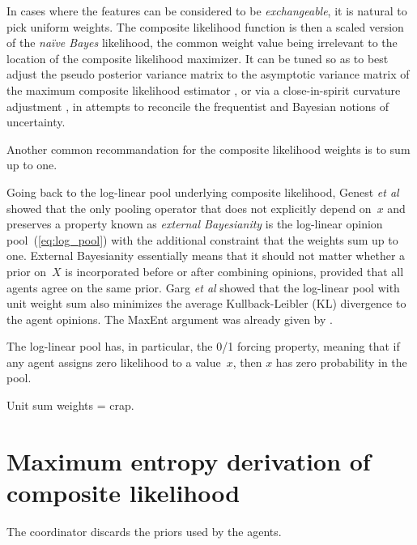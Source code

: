 \documentclass[english]{scrartcl}
\begin{document}
In cases where the features can be considered to be {\em exchangeable}, it is natural to pick uniform weights. The composite likelihood function is then a scaled version of the {\em na\"ive Bayes} likelihood, the common weight value being irrelevant to the location of the composite likelihood maximizer. It can be tuned so as to best adjust the pseudo posterior variance matrix to the asymptotic variance matrix of the maximum composite likelihood estimator \cite{Pauli-11}, or via a close-in-spirit curvature adjustment \cite{Ribatet-12}, in attempts to reconcile the frequentist and Bayesian notions of uncertainty.

Another common recommandation for the composite likelihood weights is to sum up to one. 

Going back to the log-linear pool underlying composite likelihood, Genest {\em et al} \cite{Genest-86b} showed that the only pooling operator that does not explicitly depend on~$x$ and preserves a property known as {\em external Bayesianity} is the log-linear opinion pool~(\ref{eq:log_pool}) with the additional constraint that the weights  sum up to one. External Bayesianity essentially means that it should not matter whether a prior on~$X$ is incorporated before or after combining opinions, provided that all agents agree on the same prior. Garg {\em et al} \cite{Garg-04} showed that the log-linear pool with unit weight sum also minimizes the average Kullback-Leibler (KL) divergence to the agent opinions.
The MaxEnt argument was already given by \cite{Wang-14}.



The log-linear pool has, in particular, the 0/1 forcing property, meaning that if any agent assigns zero likelihood to a value~$x$, then $x$ has zero probability in the pool. 

Unit sum weights = crap. 

\section{Maximum entropy derivation of composite likelihood}
\label{sec:maxent}

The coordinator discards the priors used by the agents. 
\end{document}
